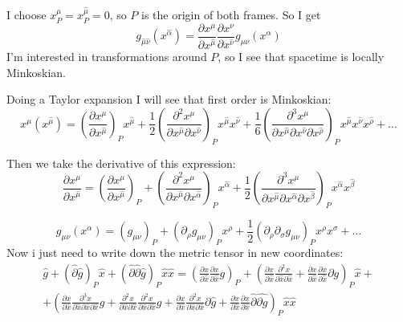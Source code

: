 I choose $x^{\mu }_{P}= x^{\hat{\mu }}_{P}=0$, so $P$ is the origin of both frames. So I get
\[
g_{\hat{\mu }\hat{\nu }}\left( x^{\hat{\alpha }} \right) = \frac{\partial x^{\mu }}{\partial x^{\hat{\mu }}} \frac{\partial x^{\nu }}{\partial x^{\hat{\nu }}} g_{\mu \nu }\left( x^{\alpha } \right) 
\]
I'm interested in transformations around $P$, so I see that spacetime is locally Minkoskian.\par
Doing a Taylor expansion I will see that first order is Minkoskian:
\begin{equation}
x^{\mu }\left( x^{\hat{\mu }} \right) = \left( \frac{\partial x^{\mu }}{\partial x^{\hat{\mu }}}  \right)_{P}x^{\hat{\mu }} + \frac{1}{2}\left( \frac{\partial^{2}x^{\mu }}{\partial x^{\hat{\mu }}\partial  x^{\hat{\nu }}}  \right)_{P}x^{\hat{\mu }}x^{\hat{\nu }}+ \frac{1}{6} \left( \frac{\partial^{3}x^{\mu }}{\partial x^{\hat{\mu }}\partial x^{\hat{\nu }}\partial x^{\hat{\rho }} }  \right)_{P} x^{\hat{\mu }}x^{\hat{\nu }}x^{\hat{\rho }}+ \ldots 
\end{equation}

Then we take the derivative of this expression:
\begin{equation}
\frac{\partial x^{\mu }}{\partial x^{\hat{\mu }}} = \left( \frac{\partial x^{\mu }}{\partial x^{\hat{\mu }}}  \right)_{P} + \left( \frac{\partial^{2}x^{\mu }}{\partial x^{\hat{\mu }}\partial x^{\hat{\alpha }} }  \right)_{P} x^{\hat{\alpha }} +\frac{1}{2} \left( \frac{\partial^{3}x^{\mu }}{\partial x^{\hat{\mu }}\partial x^{\hat{\alpha }} \partial x^{\hat{\beta  }}}  \right)_{P} x^{\hat{\alpha }}x^{\hat{\beta }}
\end{equation}

\begin{equation}
g_{\mu \nu } \left( x^{\alpha } \right) = \left( g_{\mu \nu } \right)_{P} + \left( \partial_{\rho }g_{\mu \nu } \right)_{P} x^{\rho } +\frac{1}{2} \left( \partial_{\rho }\partial _{\sigma } g_{\mu \nu } \right)_{P} x^{\rho }x^{\sigma }+ \ldots 
\end{equation}
Now i just need to write down the metric tensor in new coordinates:
\begin{gather*}
\hat{g} + \left( \hat{\partial }\hat{g} \right)_{P}\hat{x} + \left( \hat{\partial }\hat{\partial }\hat{g} \right)_{P}\hat{x}\hat{x}  = \left( \frac{\partial x}{\partial \hat{x}} \frac{\partial x}{\partial \hat{x}} g \right)_{P} + \left( \frac{\partial x}{\partial \hat{x}}  \frac{\partial^{2}x}{\partial \hat{x} \partial \hat{x}} + \frac{\partial x}{\partial \hat{x}} \frac{\partial x}{\partial \hat{x}} \partial g \right)_{P}\hat{x} + \\
+ \left( \frac{\partial x}{\partial \hat{x}} \frac{\partial^{3}x}{\partial \hat{x} \partial \hat{x} \partial \hat{x}} g + \frac{\partial^{2}x}{\partial \hat{x} \partial \hat{x}} \frac{\partial^{2}x}{\partial \hat{x} \partial \hat{x}} g + \frac{\partial x}{\partial \hat{x}} \frac{\partial^{2}x}{\partial \hat{x} \partial \hat{x}} \partial \hat{g} + \frac{\partial x}{\partial \hat{x}} \frac{\partial x}{\partial \hat{x}} \hat{\partial }\hat{\partial g} \right)_{P} \hat{x}\hat{x} 
\end{gather*}

